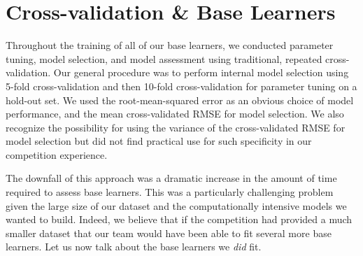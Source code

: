 \documentclass[oneside]{article}
\begin{document}
\section{Cross-validation \& Base Learners}
Throughout the training of all of our base learners, we conducted parameter tuning, model selection, and model assessment using traditional, repeated cross-validation. Our general procedure was to perform internal model selection using 5-fold cross-validation and then 10-fold cross-validation for parameter tuning on a hold-out set. We used the root-mean-squared error as an obvious choice of model performance, and the mean cross-validated RMSE for model selection. We also recognize the possibility for using the variance of the cross-validated RMSE for model selection but did not find practical use for such specificity in our competition experience.

The downfall of this approach was a dramatic increase in the amount of time required to assess base learners. This was a particularly challenging problem given the large size of our dataset and the computationally intensive models we wanted to build. Indeed, we believe that if the competition had provided a much smaller dataset that our team would have been able to fit several more base learners. Let us now talk about the base learners we \textit{did} fit.
\end{document}
